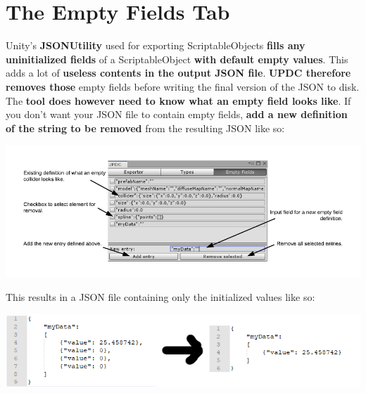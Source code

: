 \documentclass[10pt,a4paper]{article}
\begin{document}
\section{The Empty Fields Tab}
Unity's \textbf{JSONUtility} used for exporting ScriptableObjects \textbf{fills any uninitialized fields} of a ScriptableObject \textbf{with default empty values}. This adds a lot of \textbf{useless contents in the output JSON file}. \textbf{UPDC therefore removes those} empty fields before writing the final version of the JSON to disk.\\
The \textbf{tool does however need to know what an empty field looks like}. If you don't want your JSON file to contain empty fields, \textbf{add a new definition of the string to be removed} from the resulting JSON like so:
\begin{center}
\includegraphics[scale=0.6]{EmptyFieldsUI}
\end{center}
This results in a JSON file containing only the initialized values like so:
\begin{center}
\includegraphics[scale=1.0]{cleaningJson}
\end{center}
\end{document}
